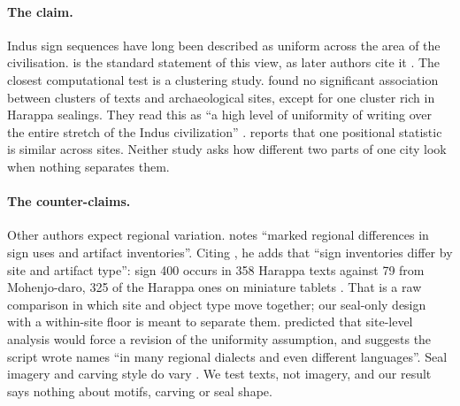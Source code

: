 \documentclass[11pt,a4paper]{article}
\begin{document}
\paragraph{The claim.} Indus sign sequences have long been described as uniform across the area of the civilisation.
\citet{parpola1994} is the standard statement of this view, as later authors cite it \citep{kenoyer2010,jamison2017}. %
The closest computational test is a clustering study.
\citet[p.~19]{yadav2017} found no significant association between clusters of texts and archaeological sites, except for one cluster rich in Harappa sealings.
They read this as ``a high level of uniformity of writing over the entire stretch of the Indus civilization'' \citep[pp.~20--21]{yadav2017}.
\citet{nair2026} reports that one positional statistic is similar across sites.
Neither study asks how different two parts of one city look when nothing separates them.

\paragraph{The counter-claims.} Other authors expect regional variation.
\citet[p.~viii]{wells2015} notes ``marked regional differences in sign uses and artifact inventories''.
Citing \citet{wells2011}, he adds that ``sign inventories differ by site and artifact type'': sign 400 occurs in 358 Harappa texts against 79 from Mohenjo-daro, 325 of the Harappa ones on miniature tablets \citep[p.~3]{wells2015}. %
That is a raw comparison in which site and object type move together; our seal-only design with a within-site floor is meant to separate them.
\citet[p.~lvi]{kenoyer2010} predicted that site-level analysis would force a revision of the uniformity assumption, and \citet[p.~219]{kenoyer2020} suggests the script wrote names ``in many regional dialects and even different languages''.
Seal imagery and carving style do vary \citep{ameri2013,jamison2017,petrie2018}. %
We test texts, not imagery, and our result says nothing about motifs, carving or seal shape.
\end{document}
